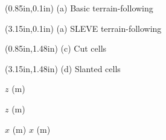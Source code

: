 \documentclass{article}
\begin{document}
\TPMargin{2pt}
\begin{textblock*}{12em}(0.85in,0.1in)
\normalsize
{}
(a) Basic terrain-following
\end{textblock*}
\begin{textblock*}{12em}(3.15in,0.1in)
\normalsize
{}
(a) SLEVE terrain-following
\end{textblock*}
\begin{textblock*}{6em}(0.85in,1.48in)
\normalsize
{}
(c) Cut cells
\end{textblock*}
\begin{textblock*}{7em}(3.15in,1.48in)
\normalsize
{}
(d) Slanted cells
\end{textblock*}

$z$ (\si{\meter}) 

$z$ (\si{\meter}) 

\vspace{0.5em}
\hspace*{13em}$x$ (\si{\meter}) \hspace*{14em} $x$ (\si{\meter})
\end{document}

